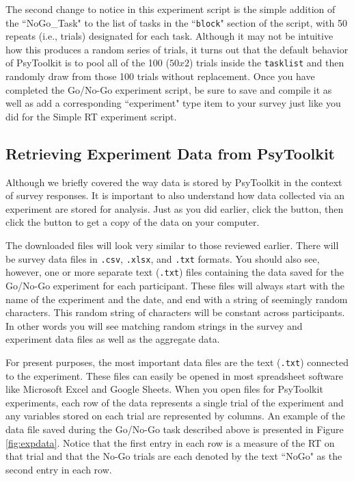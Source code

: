 The second change to notice in this experiment script is the simple addition of the ``NoGo\_Task" to the list of tasks in the ``\texttt{block}" section of the script, with 50 repeats (i.e., trials) designated for each task.  Although it may not be intuitive how this produces a random series of trials, it turns out that the default behavior of PsyToolkit is to pool all of the 100 ($50x2$) trials inside the \texttt{tasklist} and then randomly draw from those 100 trials without replacement.  Once you have completed the Go/No-Go experiment script, be sure to save and compile it as well as add a corresponding ``experiment" type item to your survey just like you did for the Simple RT experiment script.

\subsection{Retrieving Experiment Data from PsyToolkit}
Although we briefly covered the way data is stored by PsyToolkit in the context of survey responses.  It is important to also understand how data collected via an experiment are stored for analysis.  Just as you did earlier, click the  button, then click the  button to get a copy of the data on your computer.

The downloaded files will look very similar to those reviewed earlier.  There will be survey data files in \texttt{.csv}, \texttt{.xlsx}, and \texttt{.txt} formats.  You should also see, however, one or more separate text (\texttt{.txt}) files containing the data saved for the Go/No-Go experiment for each participant.  These files will always start with the name of the experiment and the date, and end with a string of seemingly random characters.  This random string of characters will be constant across participants.  In other words you will see matching  random strings in the survey and experiment data files as well as the aggregate data.

For present purposes, the most important data files are the text (\texttt{.txt}) connected to the experiment.  These files can easily be opened in most spreadsheet software like Microsoft Excel and Google Sheets. When you open  files for PsyToolkit experiments, each row of the data represents a single trial of the experiment and any variables stored on each trial are represented by columns.  An example of the data file saved during the Go/No-Go task described above is presented in Figure \ref{fig:expdata}. Notice that the first entry in each row is a measure of the RT on that trial and that the No-Go trials are each denoted by the text ``NoGo" as the second entry in each row.

